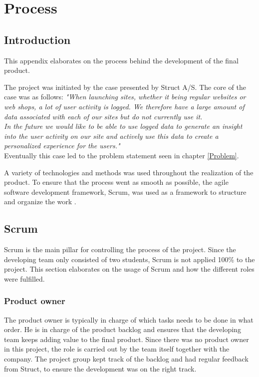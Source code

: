 
\chapter{Process} %

\label{Appendix D} %


\section{Introduction}
This appendix elaborates on the process behind the development of the final product.

The project was initiated by the case presented by Struct A/S. The core of the case was as follows:
\textit{"When launching sites, whether it being regular websites or web shops, a lot of user activity is logged. We therefore have a large amount of data associated with each of our sites but do not currently use it.} \\
\textit{In the future we would like to be able to use logged data to generate an insight into the user activity on our site and actively use this data to create a personalized experience for the users."} \\
Eventually this case led to the problem statement seen in chapter \ref{Problem}.

A variety of technologies and methods was used throughout the realization of the product. To ensure that the process went as smooth as possible, the agile software development framework, Scrum, was used as a framework to structure and organize the work \cite{Scrum}.

\section{Scrum}
Scrum is the main pillar for controlling the process of the project. Since the developing team only consisted of two students, Scrum is not applied 100\% to the project. This section elaborates on the usage of Scrum and how the different roles were fulfilled.

\subsection{Product owner}
The product owner is typically in charge of which tasks needs to be done in what order. He is in charge of the product backlog and ensures that the developing team keeps adding value to the final product. Since there was no product owner in this project, the role is carried out by the team itself together with the company. The project group kept track of the backlog and had regular feedback from Struct, to ensure the development was on the right track.

